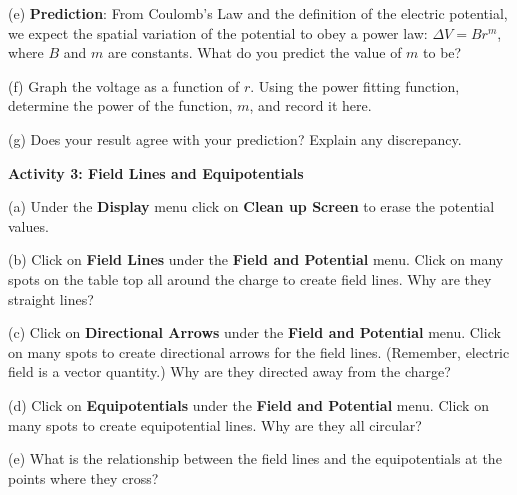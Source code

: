 


(e) \textbf{Prediction}: From Coulomb's Law and the definition of the
electric potential, we expect the spatial variation of the potential
to obey a power law: \( \Delta V=Br^{m} \), where \( B \) and \( m \)
are constants. What do you predict the value of \( m \) to be?
\vspace{12mm}

(f) Graph the voltage as a function of $r$. Using the power fitting
function, determine the power of the function, $m$, and record it here.
\vspace{12mm}

(g) Does your result agree with your prediction? Explain any discrepancy.
\vspace{12mm}

\textbf{Activity 3: Field Lines and Equipotentials}

(a) Under the {\bf Display} menu click on {\bf Clean up Screen} to erase the 
potential values.

(b) Click on {\bf Field Lines} under the {\bf Field and Potential} menu. Click on many spots on the table top all around the charge to create field lines. Why are they straight lines?
\vspace{30mm}

(c) Click on {\bf Directional Arrows} under the {\bf Field and Potential} menu. Click on many spots to create directional arrows for the field lines. (Remember, electric field is a vector quantity.) Why are they directed away from the charge?
\vspace{30mm}

(d) Click on {\bf Equipotentials} under the {\bf Field and Potential} menu. Click on many spots to create equipotential lines. Why are they all circular?
\vspace{30mm}

(e) What is the relationship between the field lines and the equipotentials at 
the points where they cross?
